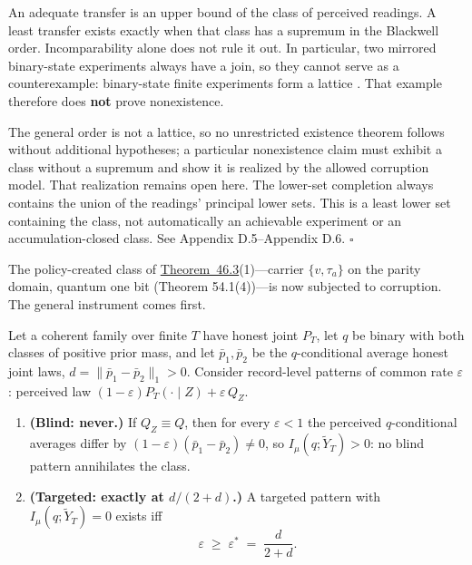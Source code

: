 
\begin{thmplain}

An adequate transfer is an upper bound of the class of perceived readings. A least transfer exists exactly when that class has a supremum in the Blackwell order. Incomparability alone does not rule it out. In particular, two mirrored binary-state experiments always have a join, so they cannot serve as a counterexample: binary-state finite experiments form a lattice \autocite{bertschinger2014}. That example therefore does \textbf{not} prove nonexistence.

The general order is not a lattice, so no unrestricted existence theorem follows without additional hypotheses; a particular nonexistence claim must exhibit a class without a supremum and show it is realized by the allowed corruption model. That realization remains open here. The lower-set completion always contains the union of the readings' principal lower sets. This is a least lower set containing the class, not automatically an achievable experiment or an accumulation-closed class. See Appendix D.5--Appendix D.6. \(\square\)
\end{thmplain}


The policy-created class of \hyperlink{stmt:46.3}{Theorem~46.3}(1)---\hspace{0pt}carrier \(\{v, \tau_a\}\) on the parity domain, quantum one bit (Theorem 54.1(4))---\hspace{0pt}is now subjected to corruption. The general instrument comes first.

\begin{thmplain}

Let a coherent family over finite \(T\) have honest joint \(P_T\), let \(q\) be binary with both classes of positive prior mass, and let \(\bar p_1, \bar p_2\) be the \(q\)-conditional average honest joint laws, \(d = \lVert \bar p_1 - \bar p_2 \rVert_1 > 0\). Consider record-level patterns of common rate \(\varepsilon\): perceived law \((1-\varepsilon) P_T(\cdot \mid Z) + \varepsilon\, Q_Z\).

\begin{enumerate}
\def\labelenumi{\arabic{enumi}.}
\tightlist
\item
  \textbf{(Blind: never.)} If \(Q_Z \equiv Q\), then for every \(\varepsilon < 1\) the perceived \(q\)-conditional averages differ by \((1-\varepsilon)(\bar p_1 - \bar p_2) \ne 0\), so \(I_\mu(q; \widetilde{Y}_T) > 0\): no blind pattern annihilates the class.
\item
  \textbf{(Targeted: exactly at \(d/(2+d)\).)} A targeted pattern with \(I_\mu(q; \widetilde{Y}_T) = 0\) exists iff
  \[
  \varepsilon \;\ge\; \varepsilon^* \;=\; \frac{d}{2 + d}.
  \]
\end{enumerate}
\end{thmplain}

